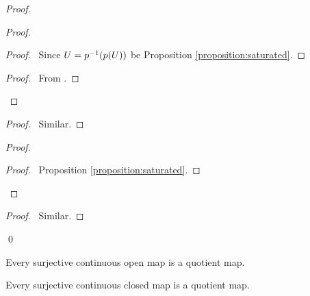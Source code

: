 \begin{proof}
    \pf
    \begin{proof}
        \begin{proof}
            \pf\ Since $U = {p}^{-1}(p(U))$ be Proposition \ref{proposition:saturated}.
        \end{proof}
        \begin{proof}
            \pf\ From .
        \end{proof}
    \end{proof}
    \begin{proof}
        \pf\ Similar.
    \end{proof}
    \begin{proof}
        \begin{proof}
            \pf\ Proposition \ref{proposition:saturated}.
        \end{proof}
    \end{proof}
    \begin{proof}
        \pf\ Similar.
    \end{proof}
    \qed
\end{proof}

\begin{corollary}
    \label{corollary:quotient_continuous_open}
    Every surjective continuous open map is a quotient map.
\end{corollary}

\begin{corollary}
    Every surjective continuous closed map is a quotient map.
\end{corollary}

